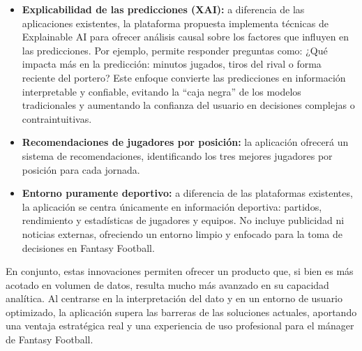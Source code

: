\begin{itemize}
\item \textbf{Explicabilidad de las predicciones (XAI):} a diferencia de las aplicaciones 
existentes, la plataforma propuesta implementa técnicas de Explainable AI para ofrecer análisis causal 
sobre los factores que influyen en las predicciones. Por ejemplo, permite responder preguntas como: 
¿Qué impacta más en la predicción: minutos jugados, tiros del rival o forma reciente del portero? 
Este enfoque convierte las predicciones en información interpretable y confiable, evitando la ``caja 
negra'' de los modelos tradicionales y aumentando la confianza del usuario en decisiones complejas o 
contraintuitivas.

\item \textbf{Recomendaciones de jugadores por posición:} la aplicación ofrecerá un sistema de 
recomendaciones, identificando los tres mejores jugadores por posición para cada jornada.

\item \textbf{Entorno puramente deportivo:} a diferencia de las plataformas existentes, la 
aplicación se centra únicamente en información deportiva: partidos, rendimiento y estadísticas de 
jugadores y equipos. No incluye publicidad ni noticias externas, ofreciendo un entorno limpio y 
enfocado para la toma de decisiones en Fantasy Football.
\end{itemize}

En conjunto, estas innovaciones permiten ofrecer un producto que, si bien es más acotado en volumen 
de datos, resulta mucho más avanzado en su capacidad analítica. Al centrarse en la interpretación del 
dato y en un entorno de usuario optimizado, la aplicación supera las barreras de las soluciones 
actuales, aportando una ventaja estratégica real y una experiencia de uso profesional para el mánager 
de Fantasy Football.

